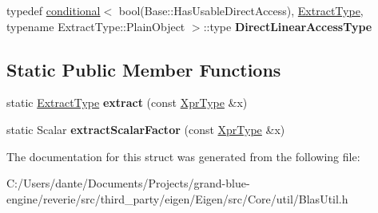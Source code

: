 \begin{DoxyCompactItemize}
\item 
\mbox{\label{struct_eigen_1_1internal_1_1blas__traits_3_01_transpose_3_01_nested_xpr_01_4_01_4_a26aca4a666455214557b32b7c8513820}} 
typedef \mbox{\hyperlink{struct_eigen_1_1internal_1_1conditional}{conditional}}$<$ bool(Base\+::\+Has\+Usable\+Direct\+Access), \mbox{\hyperlink{class_eigen_1_1_transpose}{Extract\+Type}}, typename Extract\+Type\+::\+Plain\+Object $>$\+::type {\bfseries Direct\+Linear\+Access\+Type}
\end{DoxyCompactItemize}
\subsection*{Static Public Member Functions}
\begin{DoxyCompactItemize}
\item 
\mbox{\label{struct_eigen_1_1internal_1_1blas__traits_3_01_transpose_3_01_nested_xpr_01_4_01_4_a4263fd65419c2513eb9a6e1d45b21b86}} 
static \mbox{\hyperlink{class_eigen_1_1_transpose}{Extract\+Type}} {\bfseries extract} (const \mbox{\hyperlink{class_eigen_1_1_transpose}{Xpr\+Type}} \&x)
\item 
\mbox{\label{struct_eigen_1_1internal_1_1blas__traits_3_01_transpose_3_01_nested_xpr_01_4_01_4_adc4186cfbda6b18cc3b061212e42fb36}} 
static Scalar {\bfseries extract\+Scalar\+Factor} (const \mbox{\hyperlink{class_eigen_1_1_transpose}{Xpr\+Type}} \&x)
\end{DoxyCompactItemize}


The documentation for this struct was generated from the following file\+:\begin{DoxyCompactItemize}
\item 
C\+:/\+Users/dante/\+Documents/\+Projects/grand-\/blue-\/engine/reverie/src/third\+\_\+party/eigen/\+Eigen/src/\+Core/util/Blas\+Util.\+h\end{DoxyCompactItemize}
